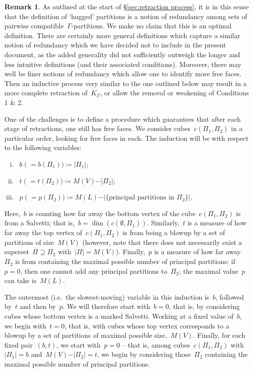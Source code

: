 \documentclass[11pt]{amsart}
\theoremstyle{definition}
\theoremstyle{definition}
\theoremstyle{definition}
\theoremstyle{definition}
\newtheorem{remark}[theorem]{Remark}
\newcommand{\spine}{K_{\Gamma}} %
\begin{document}
\begin{remark}
    As outlined at the start of \S\ref{sec:retraction process}, it is in this sense that the definition of `hugged' partitions is a notion of redundancy among sets of pairwise compatible~$\Gamma$-partitions. We make no claim that this is an optimal definition. There are certainly more general definitions which capture a similar notion of redundancy which we have decided not to include in the present document, as the added generality did not sufficiently outweigh the longer and less intuitive definitions (and their associated conditions). Moreover, there may well be finer notions of redundancy which allow one to identify more free faces. Then an inductive process very similar to the one outlined below may result in a more complete retraction of~$\spine$, or allow the removal or weakening of Conditions 1 \& 2.
\end{remark}

One of the challenges is to define a procedure which guarantees that after each stage of retractions, one still has free faces. We consider cubes~$c(\Pi_1, \Pi_2)$ in a particular order, looking for free faces in each. The induction will be with respect to the following variables:

\begin{enumerate}[(i)]
    \item~$b \;\text{($\;=b(\Pi_1)$)} \coloneqq \vert \Pi_1 \vert$;
    \item~$t \;\text{($\;=t(\Pi_2)$)} \coloneqq M(V) - \vert \Pi_2 \vert$;
    \item~$p \;\text{($\;=p(\Pi_2)$)} \coloneqq M(L) - \vert \{\text{principal partitions in~$\Pi_2$}\} \vert$.
\end{enumerate}

Here,~$b$ is counting how far away the bottom vertex of the cube~$c(\Pi_1, \Pi_2)$ is from a Salvetti; that is,~$b = \dim\left(c(\emptyset, \Pi_1)\right)$. Similarly,~$t$ is a measure of how far away the top vertex of~$c(\Pi_1, \Pi_2)$ is from being a blowup by a set of partitions of size~$M(V)$ (however, note that there does not necessarily exist a superset~$\Pi \supseteq \Pi_2$ with~$\vert \Pi \vert = M(V)$). Finally,~$p$ is a measure of how far away~$\Pi_2$ is from containing the maximal possible number of principal partitions: if~$p = 0$, then one cannot add any principal partitions to~$\Pi_2$; the maximal value~$p$ can take is~$M(L)$.

The outermost (i.e.~the slowest-moving) variable in this induction is~$b$, followed by~$t$ and then by~$p$. We will therefore start with~$b = 0$, that is, by considering cubes whose bottom vertex is a marked Salvetti. Working at a fixed value of~$b$, we begin with~$t = 0$, that is, with cubes whose top vertex corresponds to a blowup by a set of partitions of maximal possible size,~$M(V)$. Finally, for each fixed pair~$(b, t)$, we start with~$p = 0$ -- that is, among cubes~$c(\Pi_1, \Pi_2)$ with~$\vert \Pi_1 \vert = b$ and~$M(V) - \vert \Pi_2 \vert = t$, we begin by considering those~$\Pi_2$ containing the maximal possible number of principal partitions.
\end{document}

